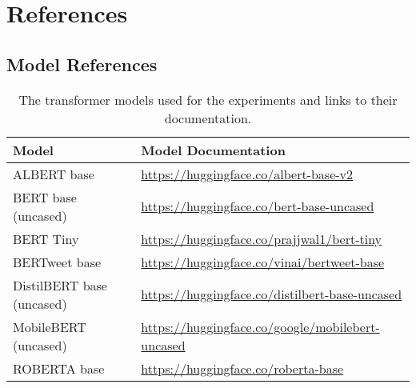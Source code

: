 \chapter{References}

\section{Model References}

\begin{table}[ht]
    \captionsetup{font=small}
    \centering
    \begin{tabularx}{\textwidth}{|l|X|}
        \hline
        \rowcolor[gray]{0.7}
        \textbf{Model}  & \textbf{Model Documentation} \\
        \hline

        ALBERT base  & \small{\url{https://huggingface.co/albert-base-v2}} \\
        \hline        
        BERT base (uncased)  & \small{\url{https://huggingface.co/bert-base-uncased}} \\
        \hline
        BERT Tiny  & \small{\url{https://huggingface.co/prajjwal1/bert-tiny}} \\
        \hline        
        BERTweet base  & \small{\url{https://huggingface.co/vinai/bertweet-base}} \\
        \hline
        DistilBERT base (uncased)  & \small{\url{https://huggingface.co/distilbert-base-uncased}} \\
        \hline
        MobileBERT (uncased) & \small{\url{https://huggingface.co/google/mobilebert-uncased}} \\
        \hline
        ROBERTA base & \small{\url{https://huggingface.co/roberta-base}} \\
        \hline 
    \end{tabularx}
    \caption{The transformer models used for the experiments and links to their documentation.}    
    \label{tab: apdx_model_doc}
\end{table}
